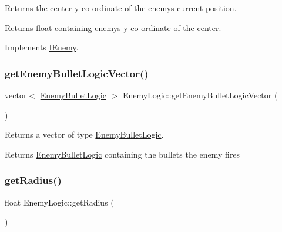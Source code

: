 Returns the center y co-\/ordinate of the enemy\textquotesingle{}s current position. 

\begin{DoxyReturn}{Returns}
float containing enemy\textquotesingle{}s y co-\/ordinate of the center. 
\end{DoxyReturn}


Implements \hyperlink{class_i_enemy_ac9a2d69103fa86d8344aa368fb33c714}{I\+Enemy}.

\mbox{\label{class_enemy_logic_ae4e49b9f854bc0407510de8e3824c7c4}} 
\subsubsection{\texorpdfstring{get\+Enemy\+Bullet\+Logic\+Vector()}{getEnemyBulletLogicVector()}}
{\footnotesize\ttfamily vector$<$ \hyperlink{class_enemy_bullet_logic}{Enemy\+Bullet\+Logic} $>$ Enemy\+Logic\+::get\+Enemy\+Bullet\+Logic\+Vector (\begin{DoxyParamCaption}{ }\end{DoxyParamCaption})}



Returns a vector of type \hyperlink{class_enemy_bullet_logic}{Enemy\+Bullet\+Logic}. 

\begin{DoxyReturn}{Returns}
\hyperlink{class_enemy_bullet_logic}{Enemy\+Bullet\+Logic} containing the bullets the enemy fires 
\end{DoxyReturn}
\mbox{\label{class_enemy_logic_ab6736c870e69bc20bef8d6d010946eb2}} 
\subsubsection{\texorpdfstring{get\+Radius()}{getRadius()}}
{\footnotesize\ttfamily float Enemy\+Logic\+::get\+Radius (\begin{DoxyParamCaption}{ }\end{DoxyParamCaption})\hspace{0.3cm}{\ttfamily [virtual]}}



